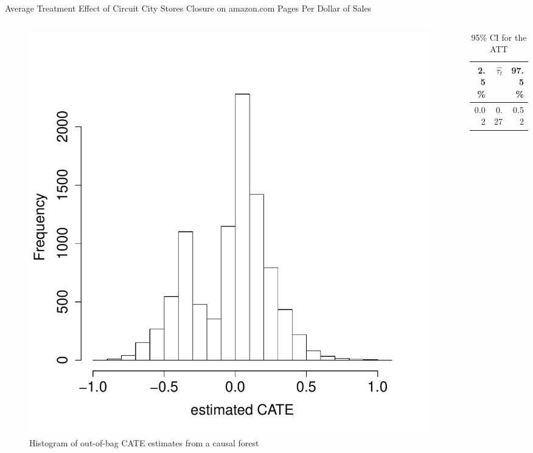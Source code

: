\documentclass[mathserif, xcolor=table]{beamer}
\begin{document}
\begin{frame}{Average Treatment Effect of Circuit City Stores Closure on amazon.com Pages Per Dollar of Sales}
	\vspace{-1em}
	\begin{columns}
		\begin{column}{.6\textwidth}
			\begin{figure}[h]
				\centering
				\includegraphics[scale=0.3]{pic/tauhat3_ama_hist.pdf}
				\caption{ Histogram of out-of-bag CATE estimates from a causal forest}
				\label{fig:tauhat3_ama_hist}
			\end{figure}
		\end{column}
		
		\begin{column}{.39\textwidth}
			\begin{table}[h]
				\caption{95\% CI for the ATT} 
				\centering
				\begin{tabular}{rrr}
					\hline
					2.5\%  & $\hat{\tau_t}$ & 97.5\% \\ 
					\hline
					0.02 & 0.27 & 0.52 \\ 
					\hline
				\end{tabular}
			\end{table}
		\end{column}
	\end{columns}
\end{frame}
\end{document}
